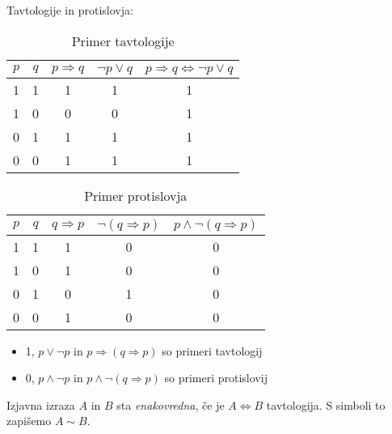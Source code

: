 \documentclass[12pt, a4paper]{article}
\renewcommand{\implies}{\Rightarrow}
\renewcommand{\iff}{\Leftrightarrow}
\begin{document}
\begin{zgled}
Tavtologije in protislovja:

\begin{multicols}{2}
\begin{table}[H]
\begin{tabular}{cc||ccc}
$p$ & $q$ & $p\implies q$ & $\neg p\lor q$ & $p\implies q\iff\neg p\lor q$ \\
\hline\hline
1 & 1 & 1 & 1 & 1 \\
1 & 0 & 0 & 0 & 1 \\
0 & 1 & 1 & 1 & 1 \\
0 & 0 & 1 & 1 & 1 \\
\end{tabular}
\caption{Primer tavtologije}
\end{table}

\begin{table}[H]
\begin{tabular}{cc||ccc}
$p$ & $q$ & $q\implies p$ & $\neg(q\implies p)$ & $p\land\neg(q\implies p)$ \\
\hline \hline
1 & 1 & 1 & 0 & 0 \\
1 & 0 & 1 & 0 & 0 \\
0 & 1 & 0 & 1 & 0 \\
0 & 0 & 1 & 0 & 0 \\
\end{tabular}
\caption{Primer protislovja}
\end{table}
\end{multicols}

\begin{itemize}
\item 1, $p\lor\neg p$ in $p\implies(q\implies p)$ so primeri tavtologij
\item 0, $p\land\neg p$ in $p\land\neg(q\implies p)$ so primeri protislovij
\end{itemize}
\end{zgled}

\begin{definicija}
Izjavna izraza $A$ in $B$ sta \emph{enakovredna}, če je $A\iff B$ tavtologija. S simboli to zapišemo $A\sim B$.
\end{definicija}
\end{document}
